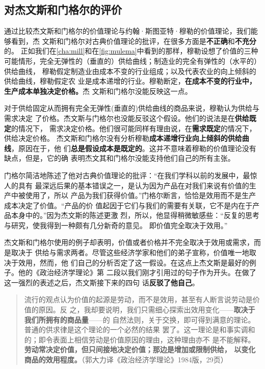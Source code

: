 \subsection{对杰文斯和门格尔的评价}

通过比较杰文斯和门格尔的价值理论与约翰·斯图亚特·穆勒的价值理论，我们能够看到，杰
文斯和门格尔对古典价值理论的批评，在很多方面是\textbf{不正确}和\textbf{不充分}的。
正如我们在\cref{cha:mill}和在\cref{fig:mulema}中看到的那样，穆勒设想了价值的三种
可能情形，完全无弹性的（垂直的）供给曲线；制造业的完全有弹性的（水平的）供给曲线，
穆勒假定制造业由成本不变的行业组成；以及代表农业的向上倾斜的供给曲线，穆勒假定农
业是成本递增的行业。穆勒断定，\textbf{在成本不变的行业中，生产成本单独决定价格。}杰
文斯和门格尔没能反映这一点。

对于供给固定从而拥有完全无弹性(垂直的)供给曲线的商品来说，穆勒认为供给与需求决定
了价格。杰文斯与门格尔也没能反驳这个假设。他们的说法是在\textbf{供给既定}的情况下，
需求决定价格。他们很可能同样有理由说，在\textbf{需求既定}的情况下，供给决定价格。
杰文斯和门格尔没有分析穆勒\textbf{成本递增行业向上倾斜的供给曲线}，原因在于，他
们\textbf{总是假设成本是既定的}。这并不意味着穆勒的价值理论没有缺点，但是，它的确
表明杰文其和门格尔没能支持他们自己的所有主张。

门格尔简洁地陈述了他对古典价值理论的批评：“在我们学科以前的发展中，最惊人的具有
最深远后果的基本错误之一，是认为因为产品在对我们来说有价值的生产中被使用了，所以
产品为我们获得价值。”门格尔断言，恰恰是效用而不是生产成本决定了价值。“产品的价
值起因于它们与我们的需要有关联，它不是内在于产品本身中的。”因为杰文斯的陈述更激
烈，所以，他显得稍微敏感些：“反复的思考与研究，使我得到一种颇有几分新奇的意见。
即价值完全取决于效用。”

杰文斯和门格尔使用的例子却表明，价值或者价格并不完全取决于效用或需求，而是取决于
供给与需求两者。尽管这些经济学家和他们的弟子宣称，价值唯一地取决于效用，然而，他
们自己的分析否定了这一假设。在这点上杰文斯是最好的例子。他的《政治经济学理论》第
二段以我们刚才引用过的句子作为开头。在做了这一强烈的表述之后，杰文斯接下来的四句
话\textbf{反驳了他自己}。

\begin{quotation}
  流行的观点认为价值的起源是劳动，而不是效用，甚至有人断言说劳动是价值的原因。反
  之，我却要说明，我们只需细心探索出效用变化——\textbf{取决于我们所拥有的商品量}——的
  自然法则，关于交换，即可得到满意的理论。普通的供求律是这个理论的一个必然的结果
  罢了。这一理论是和事实调和的；即令表面上相信劳动是价值原因的理由，这种理由亦不
  是不能解释。\textbf{劳动常决定价值，但只间接地决定价值；那边是增加或限制供给，
    以变化商品的效用程度。}（郭大力译《政治经济学理论》1984版，29页）
\end{quotation}

